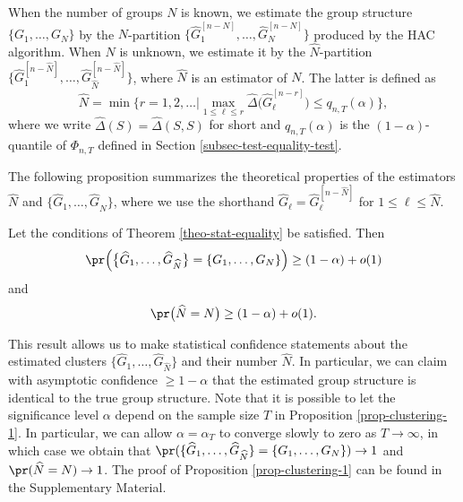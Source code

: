 When the number of groups $N$ is known, we estimate the group structure $\{G_1,\ldots, G_N\}$ by the $N$-partition $\{\widehat{G}_1^{[n-N]},\ldots,\widehat{G}_{N}^{[n-N]}\}$ produced by the HAC algorithm. When $N$ is unknown, we estimate it by the $\widehat{N}$-partition $\{\widehat{G}_1^{[n-\widehat{N}]},\ldots,\widehat{G}_{\widehat{N}}^{[n-\widehat{N}]}\}$, where $\widehat{N}$ is an estimator of $N$. The latter is defined as 
\[ \widehat{N} = \min \Big\{ r = 1,2,\ldots \Big| \max_{1 \le \ell \le r} \widehat{\Delta} \big( \widehat{G}_\ell^{[n-r]} \big) \le q_{n,T}(\alpha) \Big\}, \]
where we write $\widehat{\Delta}(S) = \widehat{\Delta}(S,S)$ for short and $q_{n,T}(\alpha)$ is the $(1-\alpha)$-quantile of $\Phi_{n,T}$ defined in Section \ref{subsec-test-equality-test}. 


\newpage
The following proposition summarizes the theoretical properties of the estimators $\widehat{N}$ and $\{ \widehat{G}_1,\ldots,\widehat{G}_{\widehat{N}} \}$, where we use the shorthand $\widehat{G}_\ell = \widehat{G}_\ell^{[n-\widehat{N}]}$ for $1 \le \ell \le \widehat{N}$. 
\begin{prop}\label{prop-clustering-1}
Let the conditions of Theorem \ref{theo-stat-equality} be satisfied. Then 
\[ \pr \Big( \big\{ \widehat{G}_1,\ldots,\widehat{G}_{\widehat{N}} \big\} = \{ G_1,\ldots,G_N \} \Big) \ge (1-\alpha) + o(1) \]
and 
\[ \pr \big( \widehat{N} = N \big) \ge (1-\alpha) + o(1). \]
\end{prop}
This result allows us to make statistical confidence statements about the estimated clusters $\{ \widehat{G}_1,\ldots,\widehat{G}_{\widehat{N}} \}$ and their number $\widehat{N}$. In particular, we can claim with asymptotic confidence $\ge 1 - \alpha$ that the estimated group structure is identical to the true group structure. Note that it is possible to let the significance level $\alpha$ depend on the sample size $T$ in Proposition \ref{prop-clustering-1}. In particular, we can allow $\alpha = \alpha_T$ to converge slowly to zero as $T \rightarrow \infty$, in which case we obtain that $\pr ( \{ \widehat{G}_1,\ldots,\widehat{G}_{\widehat{N}} \} = \{ G_1,\ldots,G_N \} ) \rightarrow 1$ and $\pr ( \widehat{N} = N ) \rightarrow 1$. The proof of Proposition \ref{prop-clustering-1} can be found in the Supplementary Material.   


